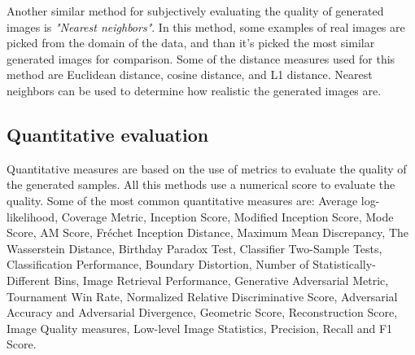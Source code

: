 Another similar method for subjectively evaluating the quality of generated images is \emph{"Nearest neighbors"}.
In this method, some examples of real images are picked from the domain of the data, and than it's picked the most similar generated images for comparison.
Some of the distance measures used for this method are Euclidean distance, cosine distance, and L1 distance.
Nearest neighbors can be used to determine how realistic the generated images are.


\subsection{Quantitative evaluation}
\label{subsec:quantitative-evaluation}
Quantitative measures are based on the use of metrics to evaluate the quality of the generated samples.
All this methods use a numerical score to evaluate the quality.
Some of the most common quantitative measures are: Average log-likelihood, Coverage Metric, Inception Score, Modified Inception Score, Mode Score, AM Score, Fréchet Inception Distance, Maximum Mean Discrepancy, The Wasserstein Distance, Birthday Paradox Test, Classifier Two-Sample Tests, Classification Performance, Boundary Distortion, Number of Statistically-Different Bins, Image Retrieval Performance, Generative Adversarial Metric, Tournament Win Rate, Normalized Relative Discriminative Score, Adversarial Accuracy and Adversarial Divergence, Geometric Score, Reconstruction Score, Image Quality measures, Low-level Image Statistics, Precision, Recall and F1 Score.\\
